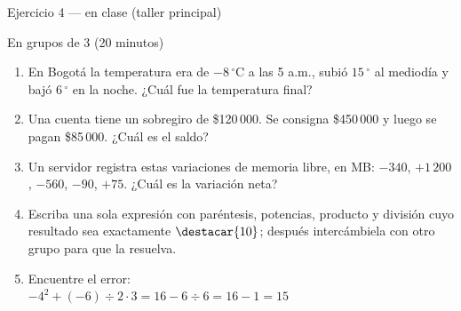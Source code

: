 \documentclass[aspectratio=169,10pt]{beamer}
\begin{document}
\begin{frame}{Ejercicio 4 — en clase (taller principal)}
  \begin{alertblock}{En grupos de 3 (20 minutos)}
    \scriptsize
    \begin{enumerate}\setlength{\itemsep}{0.06cm}
      \item En Bogotá la temperatura era de $-8\,^\circ$C a las 5 a.m., subió
            $15\,^\circ$ al mediodía y bajó $6\,^\circ$ en la noche.
            ¿Cuál fue la temperatura final?
      \item Una cuenta tiene un sobregiro de \$120\,000. Se consigna
            \$450\,000 y luego se pagan \$85\,000. ¿Cuál es el saldo?
      \item Un servidor registra estas variaciones de memoria libre, en MB:
            $-340$, $+1\,200$, $-560$, $-90$, $+75$. ¿Cuál es la variación
            neta?
      \item Escriba una sola expresión con paréntesis, potencias, producto y
            división cuyo resultado sea exactamente $\destacar{10}$; después
            intercámbiela con otro grupo para que la resuelva.
      \item Encuentre el error: \\
            \hspace*{0.3cm} $-4^2 + (-6)\div 2 \cdot 3 = 16 - 6 \div 6 = 16 - 1 = 15$
    \end{enumerate}
  \end{alertblock}
\end{frame}
\end{document}
